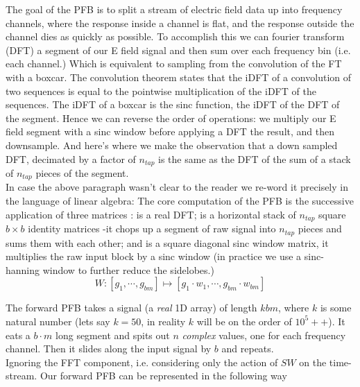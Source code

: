 \documentclass[12pt]{article}
\newcommand{\ntap}{n_{tap}}
\begin{document}
The goal of the PFB is to split a stream of electric field data up into frequency channels, where the response inside a channel is flat, and the response outside the channel dies as quickly as possible. To accomplish this we can fourier transform (DFT) a segment of our E field signal and then sum over each frequency bin (i.e. each channel.) Which is equivalent to sampling from the convolution of the FT with a boxcar. The convolution theorem states that the iDFT of a convolution of two sequences is equal to the pointwise multiplication of the iDFT of the sequences. The iDFT of a boxcar is the sinc function, the iDFT of the DFT of the segment. Hence we can reverse the order of operations: we multiply our E field segment with a sinc window before applying a DFT the result, and then downsample. And here's where we make the observation that a down sampled DFT, decimated by a factor of $\ntap$ is the same as the DFT of the sum of a stack of $\ntap$ pieces of the segment. \\

In case the above paragraph wasn't clear to the reader we re-word it precisely in the language of linear algebra: The core computation of the PFB is the successive application of three matrices :  is a real DFT;  is a horizontal stack of $\ntap$ square $b \times b$ identity matrices -it chops up a segment of raw signal into $\ntap$ pieces and sums them with each other; and  is a square diagonal sinc window matrix, it multiplies the raw input block by a sinc window (in practice we use a sinc-hanning window to further reduce the sidelobes.) \\

\begin{equation}\label{eq:W matrix}W : [g_1,\cdots,g_{bm}] \mapsto [g_1\cdot w_1,\cdots,g_{bm}\cdot w_{bm}]\end{equation}

The forward PFB takes a signal (a \textit{real} 1D array) of length $kbm$, where $k$ is some natural number (lets say $k=50$, in reality $k$ will be on the order of $10^5++$). It eats a $b\cdot m$ long segment and spits out $n$ \textit{complex} values, one for each frequency channel. Then it slides along the input signal by $b$ and repeats. \\

Ignoring the FFT component, i.e. considering only the action of $SW$ on the time-stream. Our forward PFB can be represented in the following way 
\end{document}
